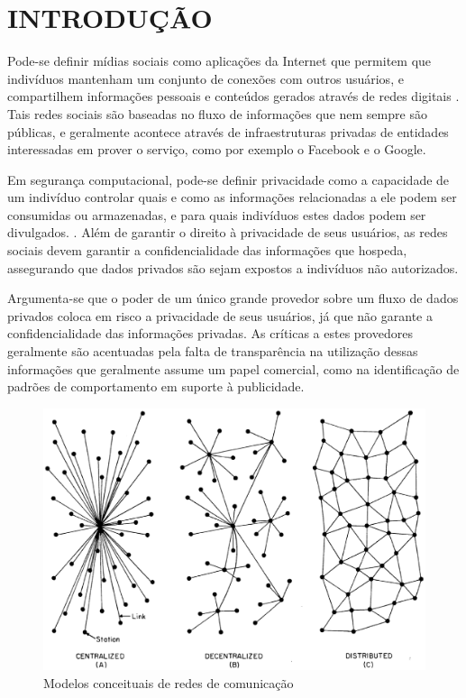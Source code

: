 \chapter{INTRODUÇÃO}

Pode-se definir mídias sociais como aplicações da Internet que permitem que
indivíduos mantenham um conjunto de conexões com outros usuários, e compartilhem
informações pessoais e conteúdos gerados através de redes digitais \cite{boyd2007}.
Tais redes sociais são baseadas no fluxo de informações que nem sempre são públicas,
e geralmente acontece através de infraestruturas privadas de entidades interessadas
em prover o serviço, como por exemplo o Facebook e o Google.

Em segurança computacional, pode-se definir privacidade como a capacidade de um
indivíduo controlar quais e como as informações relacionadas a ele podem ser
consumidas ou armazenadas, e para quais indivíduos estes dados podem ser divulgados.
\cite{stallings2010}. Além de garantir o direito à privacidade de seus usuários,
as redes sociais devem garantir a confidencialidade das informações que hospeda,
assegurando que dados privados são sejam expostos a indivíduos não autorizados.

Argumenta-se que o poder de um único grande provedor sobre um fluxo de dados
privados coloca em risco a privacidade de seus usuários, já que não garante a
confidencialidade das informações privadas. As críticas a estes provedores
geralmente são acentuadas pela falta de transparência na utilização dessas
informações que geralmente assume um papel comercial, como na identificação de
padrões de comportamento em suporte à publicidade.

\begin{figure}[!htbp]
	\centering
		\includegraphics[keepaspectratio=true,scale=0.5]{figuras/org_redes.eps}
	\caption{Modelos conceituais de redes de comunicação \cite{baran1964}}
	\label{fig:org_redes}
\end{figure}

